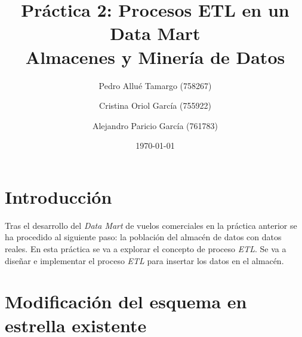 \documentclass{article}
\begin{document}
\begin{titlepage}
\title{\textbf{
    {\Huge Práctica 2: Procesos ETL en un Data Mart}\\
    {\Large Almacenes y Minería de Datos}
}}
\author{
    Pedro Allué Tamargo (758267)
    \and
    Cristina Oriol García (755922)
    \and
    Alejandro Paricio García (761783)
}
\date{\today}
\clearpage\maketitle
\thispagestyle{empty}
\end{titlepage}

\tableofcontents


\newpage
\section{Introducción}

Tras el desarrollo del \textit{Data Mart} de vuelos comerciales en la práctica anterior se ha procedido al siguiente paso: la población del almacén de datos con datos reales. En esta práctica se va a explorar el concepto de proceso \textit{ETL}. Se va a diseñar e implementar el proceso \textit{ETL} para insertar los datos en el almacén.


\section{Modificación del esquema en estrella existente}
\end{document}

